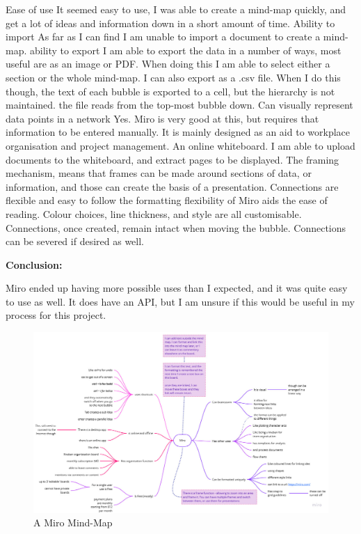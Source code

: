 \documentclass{article}
\begin{document}
\begin{outline}
    \1 Ease of use
        \2 It seemed easy to use, I was able to create a mind-map quickly, and get a lot of ideas and information down in a short amount of time.
    \1 Ability to import
        \2 As far as I can find I am unable to import a document to create a mind-map. 
    \1 ability to export
        \2 I am able to export the data in a number of ways, most useful are as an image or PDF. When doing this I am able to select either a section or the whole mind-map.
        \2 I can also export as a .csv file. When I do this though, the text of each bubble is exported to a cell, but the hierarchy is not maintained. the file reads from the top-most bubble down. 
    \1 Can visually represent data points in a network
        \2 Yes. Miro is very good at this, but requires that information to be entered manually. It is mainly designed as an aid to workplace organisation and project management. An online whiteboard. 
        \2 I am able to upload documents to the whiteboard, and extract pages to be displayed. 
        \2 The framing mechanism, means that frames can be made around sections of data, or information, and those can create the basis of a presentation.
    \1 Connections are flexible and easy to follow
        \2 the formatting flexibility of Miro aids the ease of reading. Colour choices, line thickness, and style are all customisable.
        \2 Connections, once created, remain intact when moving the bubble. Connections can be severed if desired as well. 
\end{outline}

\textbf{Conclusion:}

Miro ended up having more possible uses than I expected, and it was quite easy to use as well. It does have an API, but I am unsure if this would be useful in my process for this project.

\begin{figure}[htbp]
    \centering
    \includegraphics[width=12cm]{Images/Miro002.jpg}
    \caption{A Miro Mind-Map}
    \label{fig:Miro Mind-map}
\end{figure}
\end{document}
